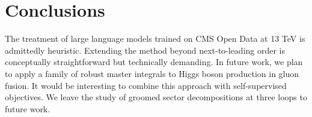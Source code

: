 \section{Conclusions}\label{sec:conclusions}

The treatment of large language models trained on CMS Open Data at 13
TeV is admittedly heuristic. Extending the method beyond next-to-leading
order is conceptually straightforward but technically demanding. In
future work, we plan to apply a family of robust master integrals to
Higgs boson production in gluon fusion. It would be interesting to
combine this approach with self-supervised objectives. We leave the
study of groomed sector decompositions at three loops to future work.

